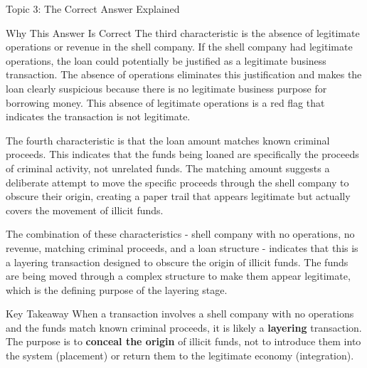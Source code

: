 \documentclass[8pt]{beamer}  %
\begin{document}
\begin{frame}{Topic 3: The Correct Answer Explained}
\begin{block}{\large Why This Answer Is Correct}
			The third characteristic is the absence of legitimate operations or revenue in the shell company. If the shell company had legitimate operations, the loan could potentially be justified as a legitimate business transaction. The absence of operations eliminates this justification and makes the loan clearly suspicious because there is no legitimate business purpose for borrowing money. This absence of legitimate operations is a red flag that indicates the transaction is not legitimate.
			
			The fourth characteristic is that the loan amount matches known criminal proceeds. This indicates that the funds being loaned are specifically the proceeds of criminal activity, not unrelated funds. The matching amount suggests a deliberate attempt to move the specific proceeds through the shell company to obscure their origin, creating a paper trail that appears legitimate but actually covers the movement of illicit funds.
			
			The combination of these characteristics - shell company with no operations, no revenue, matching criminal proceeds, and a loan structure - indicates that this is a layering transaction designed to obscure the origin of illicit funds. The funds are being moved through a complex structure to make them appear legitimate, which is the defining purpose of the layering stage.
		\end{block}
		
		\begin{alertblock}{Key Takeaway}
			When a transaction involves a shell company with no operations and the funds match known criminal proceeds, it is likely a \textbf{layering} transaction. The purpose is to \textbf{conceal the origin} of illicit funds, not to introduce them into the system (placement) or return them to the legitimate economy (integration).
		\end{alertblock}
	\end{frame}
	
\end{document}
